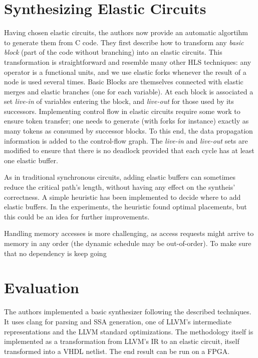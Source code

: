 \documentclass{article}
\def\todo#1{{\color{red}#1}}
\begin{document}
\section{Synthesizing Elastic Circuits}
Having chosen elastic circuits, the authors now provide an automatic algortihm to generate them from C code.
They first describe how to transform any \textit{basic block} (part of the code without branching) into an elastic circuits. This transformation is straightforward and resemble many other HLS techniques: any operator is a functional units, and we use elastic forks whenever the result of a node is used several times.
Basic Blocks are themselves connected with elastic merges and elastic branches (one for each variable).
At each block is associated a set \textit{live-in} of variables entering the block, and \textit{live-out} for those used by its successors.
Implementing control flow in elastic circuits require some work to ensure token transfer; one needs to generate (with forks for instance) exactly as many tokens as consumed by successor blocks. To this end, the data propagation information is added to the control-flow graph. The \textit{live-in} and \textit{live-out} sets are modified to ensure that there is no deadlock provided that each cycle has at least one elastic buffer.

As in traditional synchronous circuits, adding elastic buffers can sometimes reduce the critical path's length, without having any effect on the syntheis' correctness. A simple heuristic has been implemented to decide where to add elastic buffers. In the experiments, the heuristic found optimal placements, but this could be an idea for further improvements.

Handling memory accesses is more challenging, as access requests might arrive to memory in any order (the dynamic schedule may be out-of-order).
To make sure that no dependency is \todo{keep going}


\section{Evaluation}
The authors implemented a basic synthesizer following the described techniques.
It uses clang for parsing and SSA generation, one of LLVM's intermediate representations and the LLVM standard optimizations.
The methodology itself is implemented as a transformation from LLVM's IR to an elastic circuit, itself transformed into a VHDL netlist. The end result can be run on a FPGA.
\end{document}
